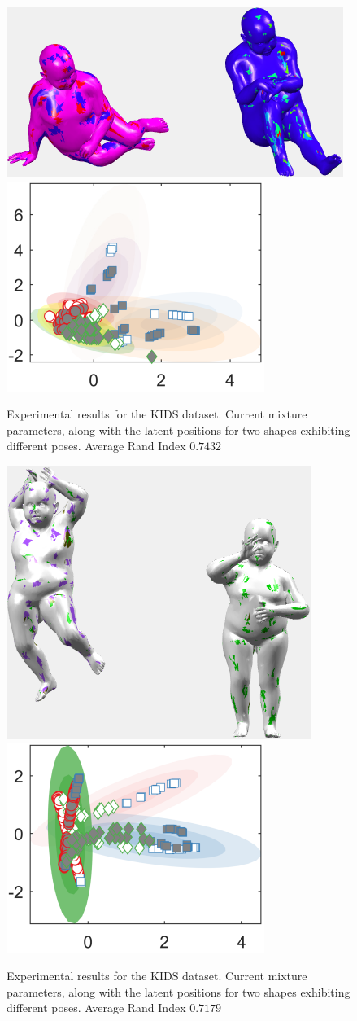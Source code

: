 \documentclass[]{article}
\begin{document}
\begin{figure}[ht!]
	\centering
	
	\includegraphics[width=0.5\linewidth]{img/kid2MVMMexp1}
	\includegraphics[width=0.35\linewidth]{img/kid2MVMMexp3}
	\caption{Experimental results for the KIDS dataset. Current mixture parameters, along with the latent positions for two shapes exhibiting different poses. Average Rand Index $0.7432$ }
\end{figure}

\begin{figure}[ht!]
	\centering
	
	\includegraphics[width=0.4\linewidth]{img/kid3MVMMexp1}
	\includegraphics[width=0.35\linewidth]{img/kid3MVMMexp3}
	\caption{Experimental results for the KIDS dataset. Current mixture parameters, along with the latent positions for two shapes exhibiting different poses. Average Rand Index $0.7179$ }
\end{figure}
\end{document}
